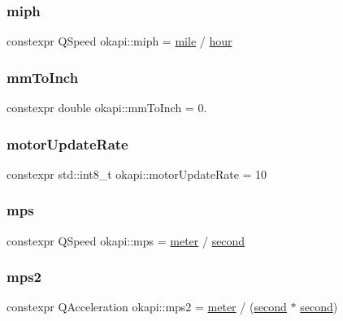 \subsubsection{\texorpdfstring{miph}{miph}}
{\footnotesize\ttfamily constexpr Q\+Speed okapi\+::miph = \mbox{\hyperlink{namespaceokapi_adb797d6d549d23e9b2e6c817a07ddfba}{mile}} / \mbox{\hyperlink{namespaceokapi_a43d321d318cb594798b60a6be26e85ce}{hour}}}

\mbox{\label{namespaceokapi_afecc245ceeabbbfe9f0e6f37fcb2d634}} 
\subsubsection{\texorpdfstring{mmToInch}{mmToInch}}
{\footnotesize\ttfamily constexpr double okapi\+::mm\+To\+Inch = 0.\hspace{0.3cm}{\ttfamily [static]}}

\mbox{\label{namespaceokapi_af6ac90c5f9ae02ffb17466bafcfbec4c}} 
\subsubsection{\texorpdfstring{motorUpdateRate}{motorUpdateRate}}
{\footnotesize\ttfamily constexpr std\+::int8\+\_\+t okapi\+::motor\+Update\+Rate = 10\hspace{0.3cm}{\ttfamily [static]}}

\mbox{\label{namespaceokapi_a133a7fbfd853bac09c6c9c2310ed8855}} 
\subsubsection{\texorpdfstring{mps}{mps}}
{\footnotesize\ttfamily constexpr Q\+Speed okapi\+::mps = \mbox{\hyperlink{namespaceokapi_a59563b3d4b18633f1c8d852e2932d1db}{meter}} / \mbox{\hyperlink{namespaceokapi_ae9ece1daf9cd9f6d3a597cc5c0dc7b40}{second}}}

\mbox{\label{namespaceokapi_a87ed91f18439f9e7e29392272f329f1c}} 
\subsubsection{\texorpdfstring{mps2}{mps2}}
{\footnotesize\ttfamily constexpr Q\+Acceleration okapi\+::mps2 = \mbox{\hyperlink{namespaceokapi_a59563b3d4b18633f1c8d852e2932d1db}{meter}} / (\mbox{\hyperlink{namespaceokapi_ae9ece1daf9cd9f6d3a597cc5c0dc7b40}{second}} $\ast$ \mbox{\hyperlink{namespaceokapi_ae9ece1daf9cd9f6d3a597cc5c0dc7b40}{second}})}

